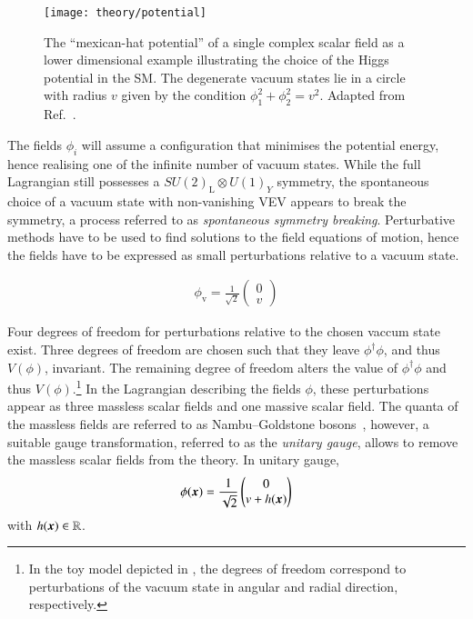 \begin{figure}[htbp]
  \centering

  \texttt{[image: theory/potential]}

  \caption{The ``mexican-hat potential'' of a single complex scalar field as a
    lower dimensional example illustrating the choice of the Higgs potential in
    the SM. The degenerate vacuum states lie in a circle with radius $v$ given
    by the condition $\phi_1^2 + \phi_2^2 = v^2$. Adapted from
    Ref.~\cite{higgs_potential_tikz}.}%
  \label{fig:mexican_hat}
\end{figure}

The fields $\phi_i$ will assume a configuration that minimises the potential
energy, hence realising one of the infinite number of vacuum states. While the
full Lagrangian still possesses a $SU(2)_{\text{L}} \otimes U(1)_Y$ symmetry,
the spontaneous choice of a vacuum state with non-vanishing VEV appears to break
the symmetry, a process referred to as \emph{spontaneous symmetry
  breaking}. Perturbative methods have to be used to find solutions to the field
equations of motion, hence the fields have to be expressed as small
perturbations relative to a vacuum state.

\begin{align*}
  \phi_{\text{v}} = \frac{1}{\sqrt{2}}
  \begin{pmatrix}
    0 \\
    v
  \end{pmatrix}
\end{align*}

Four degrees of freedom for perturbations relative to the chosen vaccum state
exist. Three degrees of freedom are chosen such that they leave
$\phi^\dagger \phi$, and thus $V(\phi)$, invariant. The remaining degree of
freedom alters the value of $\phi^\dagger \phi$ and thus $V(\phi)$.\footnote{In
  the toy model depicted in , the degrees of freedom
  correspond to perturbations of the vacuum state in angular and radial
  direction, respectively.} In the Lagrangian describing the fields $\phi$,
these perturbations appear as three massless scalar fields and one massive
scalar field. The quanta of the massless fields are referred to as
Nambu--Goldstone bosons~\cite{Nambu:1960tm,Goldstone:1961eq}, however, a
suitable gauge transformation, referred to as the \emph{unitary gauge}, allows
to remove the massless scalar fields from the theory. In unitary gauge,
\begin{align*}
  \phi(\myvec{x}) = \frac{1}{\sqrt{2}}
  \begin{pmatrix}
    0 \\
    v + h(\myvec{x})
  \end{pmatrix}
\end{align*}
with $h(\myvec{x}) \in \mathbb{R}$.


